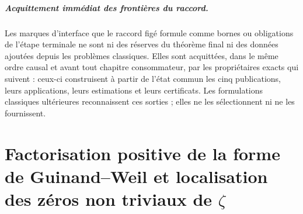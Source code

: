 \paragraph{Acquittement immédiat des frontières du raccord.}
Les marques d'interface que le raccord figé formule comme bornes ou
obligations de l'étape terminale ne sont ni des réserves du théorème final ni des données
ajoutées depuis les problèmes classiques. Elles sont acquittées, dans le même ordre
causal et avant tout chapitre consommateur, par les propriétaires exacts
qui suivent : ceux-ci construisent à partir de l'état commun les cinq publications,
leurs applications, leurs estimations et leurs certificats. Les formulations classiques
ultérieures reconnaissent ces sorties ; elles ne les sélectionnent ni ne les fournissent.
\begin{HMTScientificOwnerSubordinated}

\end{HMTScientificOwnerSubordinated}


\begingroup
\HMTDemoteHeadings

\endgroup

\HMTFlushCurrentChapter
\chapter{Factorisation positive de la forme de Guinand--Weil et localisation des zéros non triviaux de \texorpdfstring{\(\zeta\)}{zeta}}
\begingroup
\renewcommand{\chapter}[2][]{}%

\endgroup


